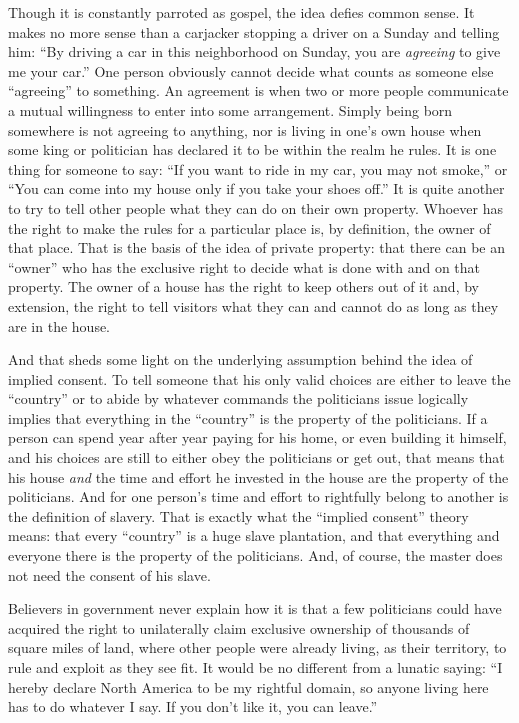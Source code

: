 \documentclass{book}
\begin{document}
Though it is constantly parroted as gospel, the idea defies common sense. It makes no more sense than a carjacker stopping a driver on a Sunday and telling him: \enquote{By driving a car in this neighborhood on Sunday, you are \emph{agreeing} to give me your car.} One person obviously cannot decide what counts as someone else \enquote{agreeing} to something. An agreement is when two or more people communicate a mutual willingness to enter into some arrangement. Simply being born somewhere is not agreeing to anything, nor is living in one's own house when some king or politician has declared it to be within the realm he rules. It is one thing for someone to say: \enquote{If you want to ride in my car, you may not smoke,} or \enquote{You can come into my house only if you take your shoes off.} It is quite another to try to tell other people what they can do on their own property. Whoever has the right to make the rules for a particular place is, by definition, the owner of that place. That is the basis of the idea of private property: that there can be an \enquote{owner} who has the exclusive right to decide what is done with and on that property. The owner of a house has the right to keep others out of it and, by extension, the right to tell visitors what they can and cannot do as long as they are in the house.

And that sheds some light on the underlying assumption behind the idea of implied consent. To tell someone that his only valid choices are either to leave the \enquote{country} or to abide by whatever commands the politicians issue logically implies that everything in the \enquote{country} is the property of the politicians. If a person can spend year after year paying for his home, or even building it himself, and his choices are still to either obey the politicians or get out, that means that his house \emph{and} the time and effort he invested in the house are the property of the politicians. And for one person's time and effort to rightfully belong to another is the definition of slavery. That is exactly what the \enquote{implied consent} theory means: that every \enquote{country} is a huge slave plantation, and that everything and everyone there is the property of the politicians. And, of course, the master does not need the consent of his slave.

Believers in government never explain how it is that a few politicians could have acquired the right to unilaterally claim exclusive ownership of thousands of square miles of land, where other people were already living, as their territory, to rule and exploit as they see fit. It would be no different from a lunatic saying: \enquote{I hereby declare North America to be my rightful domain, so anyone living here has to do whatever I say. If you don't like it, you can leave.}
\end{document}

